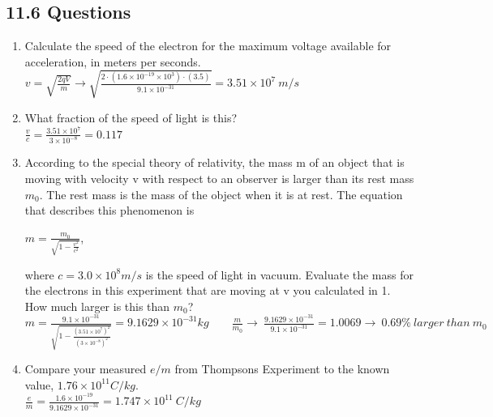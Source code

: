 \documentclass{article}
\def\F#1{\(#1\)}
\begin{document}
\subsection*{11.6 Questions}
\begin{enumerate}
  \item Calculate the speed of the electron for the maximum voltage available for acceleration, in meters per seconds.\\
  \F{v=\sqrt{\frac{2qV}{m}}\rightarrow\sqrt{\frac{2\cdot(1.6\times{10}^{-19}\times{10}^3)\cdot(3.5)}{9.1\times{10}^{-31}}}=\boxed{3.51\times{10}^7~m/s}}
  \item What fraction of the speed of light is this?\\
  \F{\frac{v}{c}=\frac{3.51\times{10}^7}{3\times{10}^{-8}}=\boxed{0.117}}
  \item According to the special theory of relativity, the mass m of an object that is moving with velocity v with respect to an observer is larger than its rest mass \F{m_0}. The rest mass is the mass of the object when it is at rest. The equation that describes this phenomenon is \begin{center}\F{m=\frac{m_0}{\sqrt{1-\frac{v^2}{c^2}}}},\end{center} where \F{c=3.0\times10^8m/s} is the speed of light in vacuum. Evaluate the mass for the electrons in this experiment that are moving at v you calculated in 1. How much larger is this than \F{m_0}?\\
  \F{m=\frac{9.1\times{10}^{-31}}{\sqrt{1-\frac{{(3.51\times{10}^7)}^2}{{(3\times{10}^{-8})}^2}}}=\boxed{9.1629\times{10}^{-31} kg}\qquad \frac{m}{m_0}\rightarrow~\frac{9.1629\times{10}^{-31}}{9.1\times{10}^{-31}}=1.0069\rightarrow~\boxed{0.69\%~larger~than~m_0}}
  \item Compare your measured \F{e/m} from Thompsons Experiment to the known value, \F{1.76\times10^{11}C/kg}.\\
  \F{\frac{e}{m}=\frac{1.6\times{10}^{-19}}{9.1629\times{10}^{-31}}=\boxed{1.747\times{10}^{11}~C/kg}}
\end{enumerate}
\end{document}
